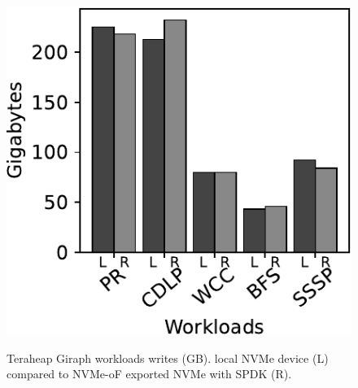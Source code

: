 \begin{figure}[H]
  \includegraphics[width=\linewidth]{figures/giraph_w.pdf}\\
\caption{Teraheap Giraph workloads writes (GB). local NVMe device (L) compared to NVMe-oF exported NVMe with SPDK (R).}
\label{fig:giraph_w}
\end{figure}
